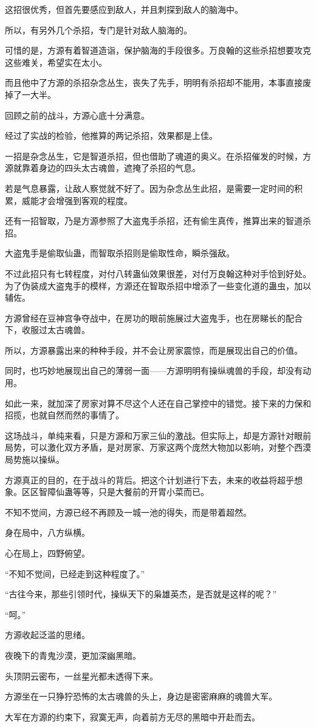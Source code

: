 \begin{this_body}
这招很优秀，但首先要感应到敌人，并且刺探到敌人的脑海中。

所以，有另外几个杀招，专门是针对敌人脑海的。

可惜的是，方源有着智道造诣，保护脑海的手段很多。万良翰的这些杀招想要攻克这些难关，希望实在太小。

而且他中了方源的杀招杂念丛生，丧失了先手，明明有杀招却不能用，本事直接废掉了一大半。

回顾之前的战斗，方源心底十分满意。

经过了实战的检验，他推算的两记杀招，效果都是上佳。

一招是杂念丛生，它是智道杀招，但也借助了魂道的奥义。在杀招催发的时候，方源就靠着身边的四头太古魂兽，遮掩了杀招的气息。

若是气息暴露，让敌人察觉就不好了。因为杂念丛生此招，是需要一定时间的积累，威能才会增强到客观的程度。

还有一招智取，乃是方源参照了大盗鬼手杀招，还有偷生真传，推算出来的智道杀招。

大盗鬼手是偷取仙蛊，而智取杀招则是偷取性命，瞬杀强敌。

不过此招只有七转程度，对付八转蛊仙效果很差，对付万良翰这种对手恰到好处。为了伪装成大盗鬼手的模样，方源还在智取杀招中增添了一些变化道的蛊虫，加以辅佐。

方源曾经在豆神宫争夺战中，在房功的眼前施展过大盗鬼手，也在房睇长的配合下，收服过太古魂兽。

所以，方源暴露出来的种种手段，并不会让房家震惊，而是展现出自己的价值。

同时，也巧妙地展现出自己的薄弱一面——方源明明有操纵魂兽的手段，却没有动用。

如此一来，就加深了房家对算不尽这个人还在自己掌控中的错觉。接下来的力保和招揽，也就自然而然的事情了。

这场战斗，单纯来看，只是方源和万家三仙的激战。但实际上，却是方源针对眼前局势，可以激化双方矛盾，是对房家、万家这两个庞然大物加以影响，对整个西漠局势施以操纵。

方源真正的目的，在于战斗的背后。把这个计划进行下去，未来的收益将超乎想象。区区智障仙蛊等等，只是大餐前的开胃小菜而已。

不知不觉间，方源已经不再顾及一城一池的得失，而是带着超然。

身在局中，八方纵横。

心在局上，四野俯望。

“不知不觉间，已经走到这种程度了。”

“古往今来，那些引领时代，操纵天下的枭雄英杰，是否就是这样的呢？”

“呵。”

方源收起泛滥的思绪。

夜晚下的青鬼沙漠，更加深幽黑暗。

头顶阴云密布，一丝星光都未透得下来。

方源坐在一只狰狞恐怖的太古魂兽的头上，身边是密密麻麻的魂兽大军。

大军在方源的约束下，寂寞无声，向着前方无尽的黑暗中开赴而去。

\end{this_body}

